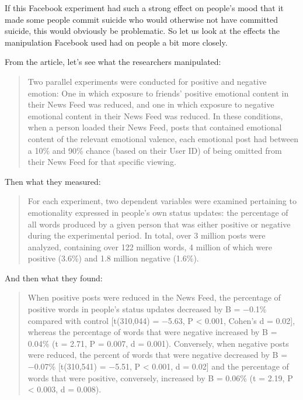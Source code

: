 \documentclass[
  oneside]{book}
\begin{document}
If this Facebook experiment had such a strong effect on people's mood that it made some people commit suicide who would otherwise not have committed suicide, this would obviously be problematic. So let us look at the effects the manipulation Facebook used had on people a bit more closely.

From the article, let's see what the researchers manipulated:

\begin{quote}
Two parallel experiments were conducted for positive and negative emotion: One in which exposure to friends' positive emotional content in their News Feed was reduced, and one in which exposure to negative emotional content in their News Feed was reduced. In these conditions, when a person loaded their News Feed, posts that contained emotional content of the relevant emotional valence, each emotional post had between a 10\% and 90\% chance (based on their User ID) of being omitted from their News Feed for that specific viewing.
\end{quote}

Then what they measured:

\begin{quote}
For each experiment, two dependent variables were examined pertaining to emotionality expressed in people's own status updates: the percentage of all words produced by a given person that was either positive or negative during the experimental period. In total, over 3 million posts were analyzed, containing over 122 million words, 4 million of which were positive (3.6\%) and 1.8 million negative (1.6\%).
\end{quote}

And then what they found:

\begin{quote}
When positive posts were reduced in the News Feed, the percentage of positive words in people's status updates decreased by B = −0.1\% compared with control {[}t(310,044) = −5.63, P \textless{} 0.001, Cohen's d = 0.02{]}, whereas the percentage of words that were negative increased by B = 0.04\% (t = 2.71, P = 0.007, d = 0.001). Conversely, when negative posts were reduced, the percent of words that were negative decreased by B = −0.07\% {[}t(310,541) = −5.51, P \textless{} 0.001, d = 0.02{]} and the percentage of words that were positive, conversely, increased by B = 0.06\% (t = 2.19, P \textless{} 0.003, d = 0.008).
\end{quote}
\end{document}
